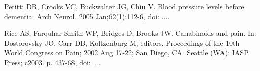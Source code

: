 \documentclass{IOS-Book-Article}
\begin{document}
\begin{thebibliography}{99}


Petitti DB, Crooks VC, Buckwalter JG, Chiu V. Blood pressure levels before dementia.
Arch Neurol. 2005 Jan;62(1):112-6, doi: ....

Rice AS, Farquhar-Smith WP, Bridges D, Brooks JW. Canabinoids and pain. In: Dostorovsky JO,
Carr DB, Koltzenburg M, editors. Proceedings of the 10th World Congress on Pain;  2002 Aug
17-22; San Diego, CA. Seattle (WA): IASP Press; c2003. p. 437-68, doi: ....

\end{thebibliography}
\end{document}
